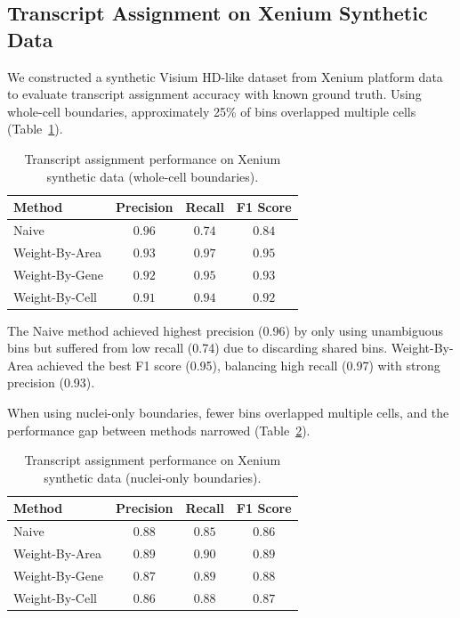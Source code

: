 \documentclass[11pt]{article}
\begin{document}
\subsection{Transcript Assignment on Xenium Synthetic Data}

We constructed a synthetic Visium HD-like dataset from Xenium platform data \citep{janesick2023xenium} to evaluate transcript assignment accuracy with known ground truth. Using whole-cell boundaries, approximately 25\% of bins overlapped multiple cells (Table~\ref{tab:xenium_whole}).

\begin{table}[H]
\centering
\caption{Transcript assignment performance on Xenium synthetic data (whole-cell boundaries).}
\label{tab:xenium_whole}
\begin{tabular}{lccc}
\toprule
\textbf{Method} & \textbf{Precision} & \textbf{Recall} & \textbf{F1 Score} \\
\midrule
Naive & $\mathbf{0.96}$ & $0.74$ & $0.84$ \\
Weight-By-Area & $0.93$ & $\mathbf{0.97}$ & $\mathbf{0.95}$ \\
Weight-By-Gene & $0.92$ & $0.95$ & $0.93$ \\
Weight-By-Cell & $0.91$ & $0.94$ & $0.92$ \\
\bottomrule
\end{tabular}
\end{table}

The Naive method achieved highest precision (0.96) by only using unambiguous bins but suffered from low recall (0.74) due to discarding shared bins. Weight-By-Area achieved the best F1 score (0.95), balancing high recall (0.97) with strong precision (0.93).

When using nuclei-only boundaries, fewer bins overlapped multiple cells, and the performance gap between methods narrowed (Table~\ref{tab:xenium_nuclei}).

\begin{table}[H]
\centering
\caption{Transcript assignment performance on Xenium synthetic data (nuclei-only boundaries).}
\label{tab:xenium_nuclei}
\begin{tabular}{lccc}
\toprule
\textbf{Method} & \textbf{Precision} & \textbf{Recall} & \textbf{F1 Score} \\
\midrule
Naive & $0.88$ & $0.85$ & $0.86$ \\
Weight-By-Area & $\mathbf{0.89}$ & $\mathbf{0.90}$ & $\mathbf{0.89}$ \\
Weight-By-Gene & $0.87$ & $0.89$ & $0.88$ \\
Weight-By-Cell & $0.86$ & $0.88$ & $0.87$ \\
\bottomrule
\end{tabular}
\end{table}
\end{document}
